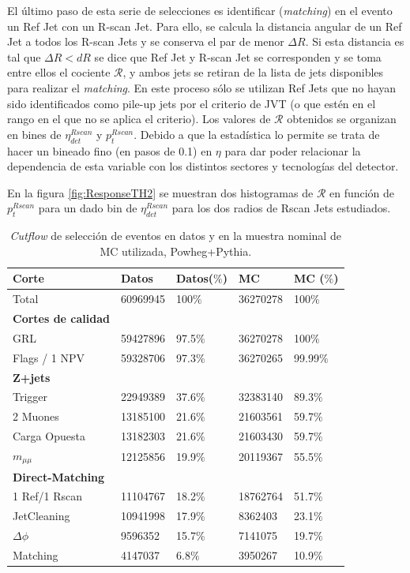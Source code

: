 El último paso de esta serie de selecciones es identificar (\textit{matching}) en el evento un Ref Jet con un R-scan Jet. Para ello, se calcula la distancia angular de un Ref Jet a todos los R-scan Jets y se conserva el par de menor $\Delta R$. Si esta distancia es tal que $\Delta R < dR$ se dice que Ref Jet y R-scan Jet se corresponden y se toma entre ellos el cociente $\mathcal{R}$, y ambos jets se retiran de la lista de jets disponibles para realizar el \textit{matching}. En este proceso sólo se utilizan Ref Jets que no hayan sido identificados como pile-up jets por el criterio de JVT (o que estén en el rango en el que no se aplica el criterio). Los valores de $\mathcal{R}$ obtenidos se organizan en bines de $\eta^{Rscan}_{det}$ y $p_t^{Rscan}$. Debido a que la estadística lo permite se trata de hacer un bineado fino (en pasos de 0.1) en $\eta$ para dar poder relacionar la dependencia de esta variable con los distintos sectores y tecnologías del detector. 

En la figura \ref{fig:ResponseTH2} se muestran dos histogramas de $\mathcal{R}$ en función de $p_t^{Rscan}$ para un dado bin de $\eta^{Rscan}_{det}$ para los dos radios de Rscan Jets estudiados.

\begin{table}[ht]
    \centering
    \begin{tabular}{|l|l|l|l|l|} 
        \hline
        Corte & Datos & Datos($\%$) & MC & MC ($\%$) \\ \hline\hline
        Total & 60969945 & 100$\%$ & 36270278 & 100$\%$ \\ \hline
        \textbf{Cortes de calidad} & & & &\\ 
        GRL   & 59427896 & 97.5$\%$ & 36270278 & 100$\%$  \\
        Flags / 1 NPV & 59328706 & 97.3$\%$ & 36270265 & 99.99$\%$ \\\hline
        \textbf{Z+jets} & & & &  \\ 
        Trigger & 22949389 & 37.6$\%$ & 32383140 & 89.3$\%$ \\ 
        2 Muones & 13185100 & 21.6$\%$ & 21603561 & 59.7$\%$\\
        Carga Opuesta & 13182303 & 21.6$\%$ & 21603430 & 59.7$\%$\\
        $m_{\mu\mu}$ & 12125856 & 19.9$\%$ & 20119367 & 55.5$\%$\\ \hline
        \textbf{Direct-Matching} & & & & \\ 
        1 Ref/1 Rscan & 11104767 & 18.2$\%$ & 18762764 & 51.7$\%$ \\
        JetCleaning & 10941998 & 17.9$\%$ & 8362403 & 23.1$\%$ \\ 
        $\Delta \phi$ & 9596352 & 15.7$\%$ & 7141075 & 19.7$\%$ \\
        Matching  & 4147037 & 6.8$\%$ & 3950267 & 10.9$\%$ \\ \hline 
        \end{tabular}
    \caption{\textit{Cutflow} de selección de eventos en datos y en la muestra nominal de MC utilizada, Powheg+Pythia.}
    \label{tab:cut}
\end{table}


